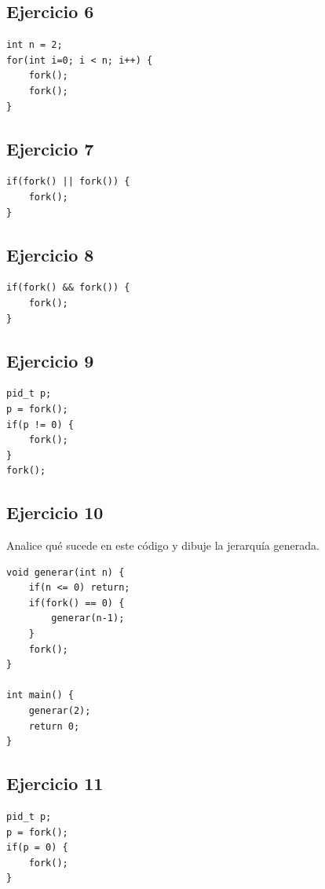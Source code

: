\documentclass[12pt,a4paper]{article}
\begin{document}
\subsection*{Ejercicio 6}
\begin{lstlisting}
int n = 2;
for(int i=0; i < n; i++) {
    fork();
    fork();
}
\end{lstlisting}

\subsection*{Ejercicio 7}
\begin{lstlisting}
if(fork() || fork()) {
    fork();
}
\end{lstlisting}

\subsection*{Ejercicio 8}
\begin{lstlisting}
if(fork() && fork()) {
    fork();
}
\end{lstlisting}

\subsection*{Ejercicio 9}
\begin{lstlisting}
pid_t p;
p = fork();
if(p != 0) {
    fork();
}
fork();
\end{lstlisting}

\newpage

\subsection*{Ejercicio 10}
Analice qué sucede en este código y dibuje la jerarquía generada.
\begin{lstlisting}
void generar(int n) {
    if(n <= 0) return;
    if(fork() == 0) {
        generar(n-1);
    }
    fork();
}

int main() {
    generar(2);
    return 0;
}
\end{lstlisting}

\subsection*{Ejercicio 11}
\begin{lstlisting}
pid_t p;
p = fork();
if(p = 0) {
    fork();
}
\end{lstlisting}
\end{document}
